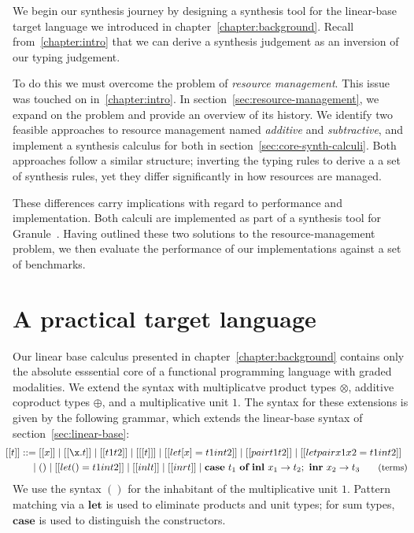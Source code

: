 

We begin our synthesis journey by designing a synthesis tool for the
linear-base target language we introduced in chapter~\ref{chapter:background}.
Recall from~\ref{chapter:intro} that we can derive a synthesis judgement as an
inversion of our typing judgement.

To do this we must overcome the problem of \textit{resource management}. This
issue was touched on in~\ref{chapter:intro}. In
section~\ref{sec:resource-management}, we expand on the problem and provide an
overview of its history. We identify two feasible approaches to resource
management named \textit{additive} and \textit{subtractive}, and implement a
synthesis calculus for both in section~\ref{sec:core-synth-calculi}. Both
approaches follow a similar structure; inverting the typing rules to derive a
a set of synthesis rules, yet they differ significantly in how resources are
managed.

These differences carry implications with regard to performance and
implementation. Both calculi are implemented as part of a synthesis tool for Granule~\cite{}. Having outlined these two solutions to the resource-management problem, we then
evaluate the performance of our implementations against a set of benchmarks.


\section{A practical target language}
Our linear base calculus presented in chapter~\ref{chapter:background} contains
only the absolute esssential core of a functional programming
language with graded modalities. We extend the syntax with multiplicatve
product types $\otimes$, additive coproduct types $\oplus$, and a multiplicative unit
$1$. The syntax for these extensions is given by the following grammar, which
extends the linear-base syntax of section~\ref{sec:linear-base}:
\begin{align*}
\hspace{-0.8em} [[ t ]] ::= \;
       & [[ x ]]
  \mid [[ \x . t ]]
  \mid [[ t1 t2 ]]
  \mid [[ [t] ]]
  \mid [[ let [ x ] = t1 in t2 ]]
\mid [[ pair t1 t2 ]]
  \mid [[ letpair x1 x2 = t1 in t2 ]] \\
\hspace{-0.9em}  \mid \; & () \mid [[ let () = t1 in t2 ]]
\mid [[ inl t ]] \mid [[ inr t ]] \mid \textbf{case} \ t_{1}\ \textbf{of}\ \textbf{inl}\ x_{1} \rightarrow t_{2};\ \textbf{inr}\ x_{2} \rightarrow t_{3}
{\small{\tag{terms}}}
\end{align*}
We use the syntax $()$ for the inhabitant of  the
multiplicative unit $1$. Pattern matching via a $\textbf{let}$
is used to eliminate products and unit types; for sum types,
$\textbf{case}$ is used to distinguish the constructors.

